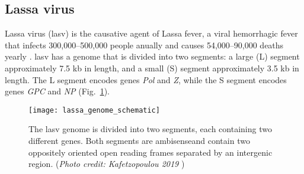 \subsection{Lassa virus}

Lassa virus (\gls{lasv}) is the causative agent of Lassa fever, a viral hemorrhagic fever that infects 300,000--500,000 people anually and causes 54,000--90,000 deaths yearly \cite{lianaThesis, asogun2012molecular}.
\gls{lasv} has a genome that is divided into two segments: a large (L) segment approximately 7.5 kb in length, and a small (S) segment approximately 3.5 kb in length.
The L segment encodes genes \textit{Pol} and \textit{Z}, while the S segment encodes genes \textit{GPC} and \textit{NP} (Fig.~\ref{fig:lasvGenome}).

\begin{figure}[ht]
  \centering
  \medskip
  \texttt{[image: lassa\_genome\_schematic]}
  \caption[Scematic of the LASV genome]{The \gls{lasv} genome is divided into two segments, each containing two different genes. Both segments are ambisenseand contain two oppositely oriented open reading frames separated by an intergenic region. (\textit{Photo credit: Kafetzopoulou 2019} \cite{lianaThesis})}
  \label{fig:lasvGenome}
\end{figure}

\cleardoublepage

